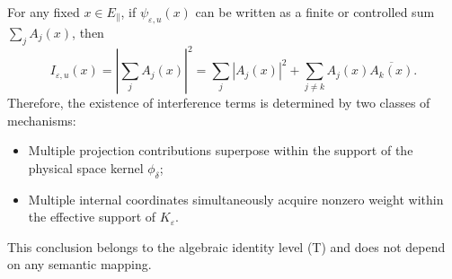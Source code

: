 For any fixed $x\in E_{\parallel}$, if $\psi_{\varepsilon,u}(x)$ can be written as a finite or controlled sum $\sum_{j}A_j(x)$, then
\[
I_{\varepsilon,u}(x)=\left|\sum_{j}A_j(x)\right|^{2}
=\sum_{j}|A_j(x)|^{2}+\sum_{j\neq k}A_j(x)\overline{A_k(x)}.
\]
Therefore, the existence of interference terms is determined by two classes of mechanisms:
\begin{itemize}
  \item Multiple projection contributions superpose within the support of the physical space kernel $\phi_{\delta}$;
  \item Multiple internal coordinates simultaneously acquire nonzero weight within the effective support of $K_{\varepsilon}$.
\end{itemize}
This conclusion belongs to the algebraic identity level (T) and does not depend on any semantic mapping.
